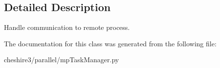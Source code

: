 \subsection{Detailed Description}
\begin{DoxyVerb}Handle communication to remote process.\end{DoxyVerb}
 

The documentation for this class was generated from the following file\-:\begin{DoxyCompactItemize}
\item 
cheshire3/parallel/mp\-Task\-Manager.\-py\end{DoxyCompactItemize}

